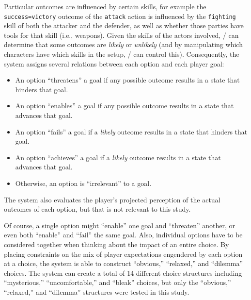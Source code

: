 Particular outcomes are influenced by certain skills, for example the \texttt{success=victory} outcome of the \texttt{attack} action is influenced by the \texttt{fighting} skill of both the attacker and the defender, as well as whether those parties have tools for that skill (i.e., weapons).
%
Given the skills of the actors involved, \dunyazad/ can determine that some outcomes are \emph{likely} or \emph{unlikely} (and by manipulating which characters have which skills in the setup, \dunyazad/ can control this).
%
Consequently, the system assigns several relations between each option and each player goal:
\begin{itemize}
  \item An option ``threatens'' a goal if any possible outcome results in a state that hinders that goal.
  \item An option ``enables'' a goal if any possible outcome results in a state that advances that goal.
  \item An option ``fails'' a goal if a \emph{likely} outcome results in a state that hinders that goal.
  \item An option ``achieves'' a goal if a \emph{likely} outcome results in a state that advances that goal.
  \item Otherwise, an option is ``irrelevant'' to a goal.
\end{itemize}
The system also evaluates the player's projected perception of the actual outcomes of each option, but that is not relevant to this study.


Of course, a single option might ``enable'' one goal and ``threaten'' another, or even both ``enable'' and ``fail'' the same goal.
%
Also, individual options have to be considered together when thinking about the impact of an entire choice.
%
By placing constraints on the mix of player expectations engendered by each option at a choice, the system is able to construct ``obvious,'' ``relaxed,'' and ``dilemma'' choices.
%
The system can create a total of 14 different choice structures including ``mysterious,'' ``uncomfortable,'' and ``bleak'' choices, but only the ``obvious,'' ``relaxed,'' and ``dilemma'' structures were tested in this study.


\label{page:choicetypes}

